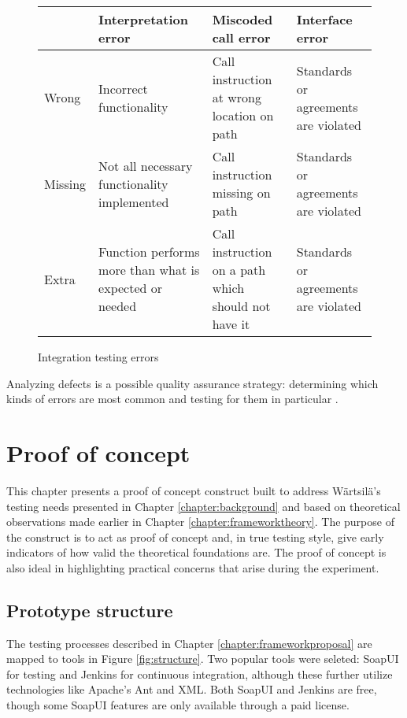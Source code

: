 \documentclass[12pt,a4paper,oneside,pdftex]{report}
\begin{document}
{{\begin{figure}[H]
\begin{center}
    \begin{tabular}{ l || >{\raggedright}p{3cm} | >{\raggedright}p{3cm} | >{\raggedright\arraybackslash}p{3cm} }
      & Interpretation error & Miscoded call error & Interface error \\ \hline \hline
    Wrong & Incorrect functionality & Call instruction at wrong location on path & Standards or agreements are violated \\ \hline
    Missing & Not all necessary functionality implemented & Call instruction missing on path & Standards or agreements are violated \\ 
    \hline
    Extra & Function performs more than what is expected or needed & Call instruction on a path which should not have it & Standards or agreements are violated \\
    \end{tabular}
\end{center}
\caption{Integration testing errors \citep{leung1990study}} \label{fig:errors}
\end{figure}

Analyzing defects is a possible quality assurance strategy: determining which kinds of errors are most common and testing for them in particular \citep{pezze2008software}. %

\chapter{Proof of concept}
\label{chapter:poc}

This chapter presents a proof of concept construct built to address Wärtsilä's testing needs presented in Chapter \ref{chapter:background} and based on theoretical observations made earlier in Chapter \ref{chapter:frameworktheory}. The purpose of the construct is to act as proof of concept and, in true testing style, give early indicators of how valid the theoretical foundations are. The proof of concept is also ideal in highlighting practical concerns that arise during the experiment.

\section{Prototype structure}

The testing processes described in Chapter \ref{chapter:frameworkproposal} are mapped to tools in Figure \ref{fig:structure}. Two popular tools were seleted: SoapUI for testing and Jenkins for continuous integration, although these further utilize technologies like Apache's Ant and XML. Both SoapUI and Jenkins are free, though some SoapUI features are only available through a paid license.

}}
\end{document}

